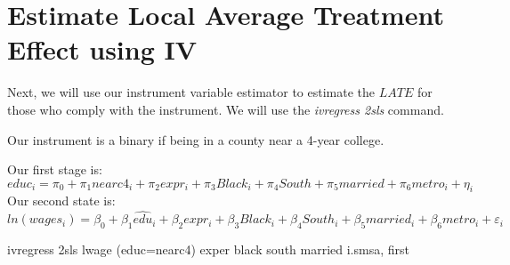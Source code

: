 \documentclass[
]{book}
\newenvironment{Shaded}{\begin{snugshade}}{\end{snugshade}}
\newcommand{\BaseNTok}[1]{\textcolor[rgb]{0.00,0.00,0.81}{#1}}
\newcommand{\NormalTok}[1]{#1}
\begin{document}
\section{Estimate Local Average Treatment Effect using IV}\label{estimate-local-average-treatment-effect-using-iv}

Next, we will use our instrument variable estimator to estimate the \(LATE\) for those who comply with the instrument. We will use the \emph{ivregress 2sls} command.

Our instrument is a binary if being in a county near a 4-year college.

Our first stage is:
\[ educ_i=\pi_0 + \pi_1 nearc4_i + \pi_2 expr_i + \pi_3 Black_i + \pi_4 South + \pi_5 married + \pi_6 metro_i + \eta_i \]
Our second state is:
\[ ln(wages_i)= \beta_0 + \beta_1 \widehat{edu}_i + \beta_2 expr_i + \beta_3 Black_i + \beta_4 South_i + \beta_5 married_i + \beta_6 metro_i + \varepsilon_i \]

\begin{Shaded}
\begin{Highlighting}[]
\NormalTok{ivregress 2sls lwage (educ=nearc4) exper }\BaseNTok{black}\NormalTok{ south married i.smsa, first }
\end{Highlighting}
\end{Shaded}
\end{document}
